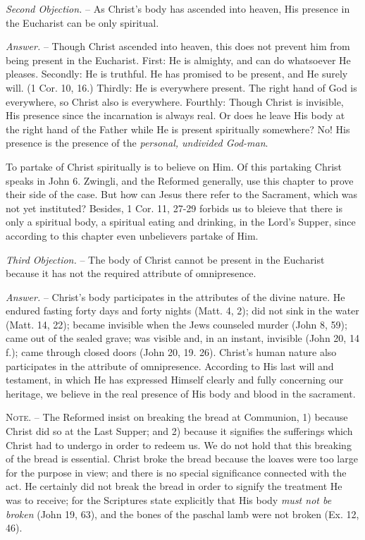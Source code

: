 \documentclass[
]{book}
\begin{document}
\emph{Second Objection.} -- As Christ's body has ascended into heaven, His presence in the Eucharist can be only spiritual.

\emph{Answer.} -- Though Christ ascended into heaven, this does not prevent him from being present in the Eucharist. First: He is almighty, and can do whatsoever He pleases. Secondly: He is truthful. He has promised to be present, and He surely will. (1 Cor. 10, 16.) Thirdly: He is everywhere present. The right hand of God is everywhere, so Christ also is everywhere. Fourthly: Though Christ is invisible, His presence since the incarnation is always real. Or does he leave His body at the right hand of the Father while He is present spiritually somewhere? No! His presence is the presence of the \emph{personal, undivided God-man}.

To partake of Christ spiritually is to believe on Him. Of this partaking Christ speaks in John 6. Zwingli, and the Reformed generally, use this chapter to prove their side of the case. But how can Jesus there refer to the Sacrament, which was not yet instituted? Besides, 1 Cor. 11, 27-29 forbids us to bleieve that there is only a spiritual body, a spiritual eating and drinking, in the Lord's Supper, since according to this chapter even unbelievers partake of Him.

\emph{Third Objection.} -- The body of Christ cannot be present in the Eucharist because it has not the required attribute of omnipresence.

\emph{Answer.} -- Christ's body participates in the attributes of the divine nature. He endured fasting forty days and forty nights (Matt. 4, 2); did not sink in the water (Matt. 14, 22); became invisible when the Jews counseled murder (John 8, 59); came out of the sealed grave; was visible and, in an instant, invisible (John 20, 14 f.); came through closed doors (John 20, 19. 26). Christ's human nature also participates in the attribute of omnipresence. According to His last will and testament, in which He has expressed Himself clearly and fully concerning our heritage, we believe in the real presence of His body and blood in the sacrament.

\textsc{Note. --} The Reformed insist on breaking the bread at Communion, 1) because Christ did so at the Last Supper; and 2) because it signifies the sufferings which Christ had to undergo in order to redeem us. We do not hold that this breaking of the bread is essential. Christ broke the bread because the loaves were too large for the purpose in view; and there is no special significance connected with the act. He certainly did not break the bread in order to signify the treatment He was to receive; for the Scriptures state explicitly that His body \emph{must not be broken} (John 19, 63), and the bones of the paschal lamb were not broken (Ex. 12, 46).
\end{document}
